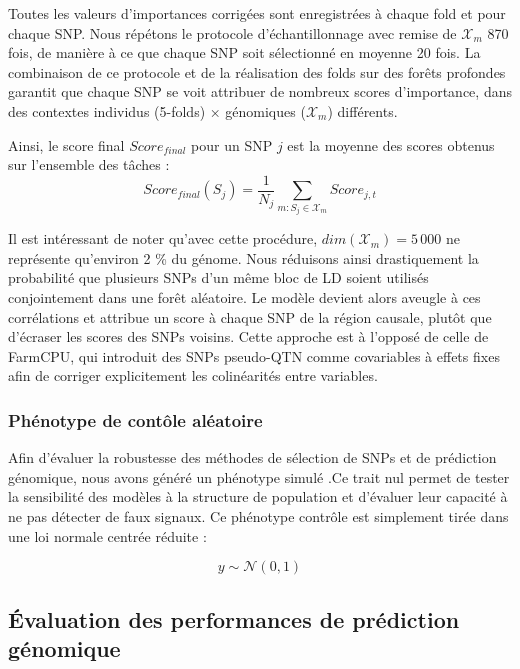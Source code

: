 \documentclass[
  11pt,
  letterpaper,
  DIV=11,
  numbers=noendperiod]{scrartcl}
\begin{document}
Toutes les valeurs d'importances corrigées sont enregistrées à chaque
fold et pour chaque SNP. Nous répétons le protocole d'échantillonnage
avec remise de \(\mathcal{X}_{m}\) 870 fois, de manière à ce que chaque
SNP soit sélectionné en moyenne 20 fois. La combinaison de ce protocole
et de la réalisation des folds sur des forêts profondes garantit que
chaque SNP se voit attribuer de nombreux scores d'importance, dans des
contextes individus (5-folds) × génomiques (\(\mathcal{X}_{m}\))
différents.

Ainsi, le score final \(Score_{final}\) pour un SNP \(j\) est la moyenne
des scores obtenus sur l'ensemble des tâches :
\[Score_{final}(S_j) = \frac{1}{N_j} \sum_{m: S_j \in \mathcal{X}_m} Score_{j,t}\]

Il est intéressant de noter qu'avec cette procédure,
\(dim(\mathcal{X}_{m}) = 5\,000\) ne représente qu'environ 2 \% du
génome. Nous réduisons ainsi drastiquement la probabilité que plusieurs
SNPs d'un même bloc de LD soient utilisés conjointement dans une forêt
aléatoire. Le modèle devient alors aveugle à ces corrélations et
attribue un score à chaque SNP de la région causale, plutôt que
d'écraser les scores des SNPs voisins. Cette approche est à l'opposé de
celle de FarmCPU, qui introduit des SNPs pseudo-QTN comme covariables à
effets fixes afin de corriger explicitement les colinéarités entre
variables.

\hypertarget{phuxe9notype-de-contuxf4le-aluxe9atoire}{%
\subsubsection{Phénotype de contôle
aléatoire}\label{phuxe9notype-de-contuxf4le-aluxe9atoire}}

Afin d'évaluer la robustesse des méthodes de sélection de SNPs et de
prédiction génomique, nous avons généré un phénotype simulé .Ce trait
nul permet de tester la sensibilité des modèles à la structure de
population et d'évaluer leur capacité à ne pas détecter de faux signaux.
Ce phénotype contrôle est simplement tirée dans une loi normale centrée
réduite :

\[y \sim \mathcal{N}(0, 1)\]

\hypertarget{uxe9valuation-des-performances-de-pruxe9diction-guxe9nomique}{%
\subsection{Évaluation des performances de prédiction
génomique}\label{uxe9valuation-des-performances-de-pruxe9diction-guxe9nomique}}
\end{document}

